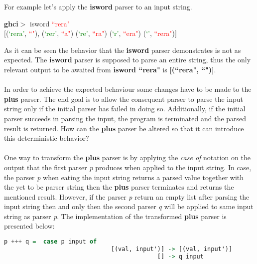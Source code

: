 \documentclass[a4paper, onecolumn]{article}
\begin{document}
    \noindent For example let's apply the \textbf{isword} parser to an input string.
    
    \begin{center}
            \textbf{ghci$>$} isword \textcolor{red}{``rera"} \\
               $\big[$(\textcolor{green}{`rera'}, \textcolor{red}{``"}), (\textcolor{green}{`rer'}, \textcolor{red}{``a"})
            (\textcolor{green}{`re'}, \textcolor{red}{``ra"})
            (\textcolor{green}{`r'}, \textcolor{red}{``era"})
            (\textcolor{green}{`'}, \textcolor{red}{``rera"})$\big]$
        \end{center}
        
    \noindent As it can be seen the behavior that the \textbf{isword} parser demonstrates is not as expected. The \textbf{isword} parser is supposed to parse an entire string, thus the only relevant output to be awaited from \textbf{isword ``rera"} is \textbf{[(``rera", ``")]}. \\ \\
      In order to achieve the expected behaviour some changes have to be made to the \textbf{plus} parser. The end goal is to allow the consequent parser to parse the input string only if the initial parser has failed in doing so. Additionally, if the initial parser succeeds in parsing the input, the program is terminated and the parsed result is returned. How can the \textbf{plus} parser be altered so that it can introduce this deterministic behavior? \\ \\ 
      One way to transform the \textbf{plus} parser is by applying the \textit{case of} notation on the output that the first parser \textit{p} produces when applied to the input string. In case, the parser \textit{p} when eating the input string returns a parsed value together with the yet to be parser string then the \textbf{plus} parser terminates and returns the mentioned result. However, if the parser \textit{p} return an empty list after parsing the input string then and only then the second parser \textit{q} will be applied to same input string as parser \textit{p}. The implementation of the transformed \textbf{plus} parser is presented below:
     
    \begin{tcolorbox}
    \begin{lstlisting}[language=Haskell] 
        p +++ q =  case p input of
                              [(val, input')] -> [(val, input')]
                                           [] -> q input
    \end{lstlisting}
    \end{tcolorbox}
     
\end{document}
